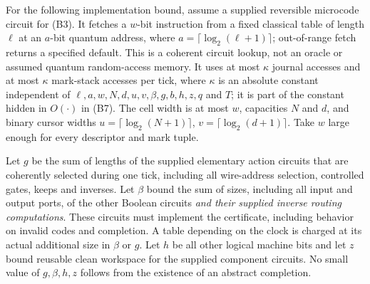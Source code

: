 \begin{definition}\label{def:tB-cost}
For the following implementation bound, assume a supplied reversible
microcode circuit for (B3). It fetches a $w$-bit instruction from a
fixed classical table of length $\ell$ at an $a$-bit quantum address,
where $a=\lceil\log_2(\ell+1)\rceil$; out-of-range fetch returns a
specified default. This is a coherent circuit lookup, not an oracle
or assumed quantum random-access memory. It uses at most $\kappa$
journal accesses and at most $\kappa$ mark-stack accesses per tick,
where $\kappa$ is an absolute constant independent of
$\ell,a,w,N,d,u,v,\beta,g,b,h,z,q$ and $T$; it is part of the
constant hidden in $O(\cdot)$ in (B7). The cell width is at most $w$,
capacities $N$ and $d$, and binary cursor widths
$u=\lceil\log_2(N+1)\rceil$, $v=\lceil\log_2(d+1)\rceil$.
Take $w$ large enough for every descriptor and mark tuple.

Let $g$ be the sum of lengths of the supplied elementary action circuits
that are coherently selected during one tick, including all wire-address
selection, controlled gates, keeps and inverses. Let $\beta$ bound the
sum of sizes, including all input and output ports, of the other Boolean
circuits \emph{and their supplied inverse
routing computations}. These circuits must implement the certificate,
including behavior on invalid codes and completion. A table depending
on the clock is charged at its actual additional size in $\beta$ or $g$.
Let $h$ be all other logical machine bits and let $z$ bound reusable clean
workspace for the supplied component circuits. No small value of
$g,\beta,h,z$ follows from the existence of an abstract completion.
\end{definition}


